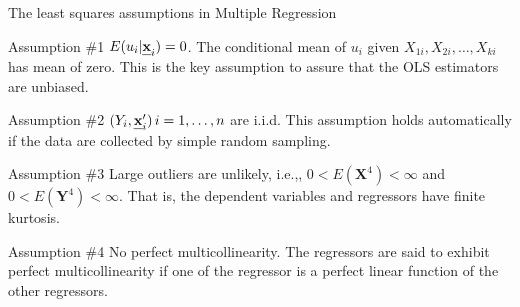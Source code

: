 \documentclass[presentation,10pt]{beamer}
\def\mathbi#1{\textbf{\em #1}}
\begin{document}
\begin{frame}[label={sec:orgf9e756a}]{The least squares assumptions in Multiple Regression}
\begin{block}{Assumption \#1}
\(E(u_i | \mathbi{x}_i) = 0\). The conditional mean
of \(u_i\) given \(X_{1i}, X_{2i}, \ldots, X_{ki}\) has
mean of zero. This is the key assumption to assure
that the OLS estimators are unbiased.
\end{block}

\begin{block}{Assumption \#2}
\((Y_i, \mathbi{x}_i^{\prime})\, i=1, \ldots, n\) are
i.i.d. This assumption holds automatically if the
data are collected by simple random sampling.
\end{block}

\begin{block}{Assumption \#3}
Large outliers are unlikely, i.e.,, \(0 <
E(\mathbf{X}^4) < \infty\) and \(0 < E(\mathbf{Y}^4)
< \infty\). That is, the dependent variables and
regressors have finite kurtosis.
\end{block}

\begin{block}{Assumption \#4}
No \alert{perfect multicollinearity}. The regressors are said to exhibit
perfect multicollinearity if one of the regressor is a perfect linear
function of the other regressors.
\end{block}
\end{frame}
\end{document}
